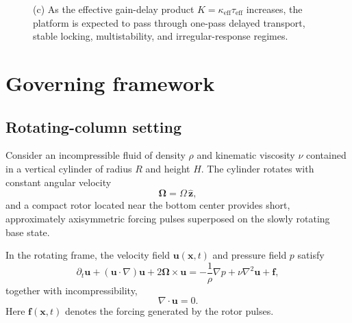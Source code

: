 \documentclass[11pt,a4paper]{article}
\begin{document}
\begin{figure}[t]
\caption{(c) As the effective gain-delay product $K=\kappa_{\mathrm{eff}}\tau_{\mathrm{eff}}$ increases, the platform is expected to pass through one-pass delayed transport, stable locking, multistability, and irregular-response regimes.}
\label{fig:master_overviewC}
\end{figure}

\section{Governing framework}

\subsection{Rotating-column setting}

Consider an incompressible fluid of density $\rho$ and kinematic viscosity $\nu$ contained in a vertical cylinder of radius $R$ and height $H$. The cylinder rotates with constant angular velocity
\begin{equation}
\bm{\Omega} = \Omega\,\hat{\mathbf z},
\end{equation}
and a compact rotor located near the bottom center provides short, approximately axisymmetric forcing pulses superposed on the slowly rotating base state.

In the rotating frame, the velocity field $\mathbf u(\mathbf x,t)$ and pressure field $p$ satisfy
\begin{equation}
\partial_t \mathbf u + (\mathbf u\cdot \nabla)\mathbf u
+ 2\bm{\Omega}\times \mathbf u
=
-\frac{1}{\rho}\nabla p
+ \nu \nabla^2 \mathbf u
+ \mathbf f,
\label{eq:NSrot}
\end{equation}
together with incompressibility,
\begin{equation}
\nabla\cdot \mathbf u = 0.
\label{eq:incomp}
\end{equation}
Here $\mathbf f(\mathbf x,t)$ denotes the forcing generated by the rotor pulses.
\end{document}
